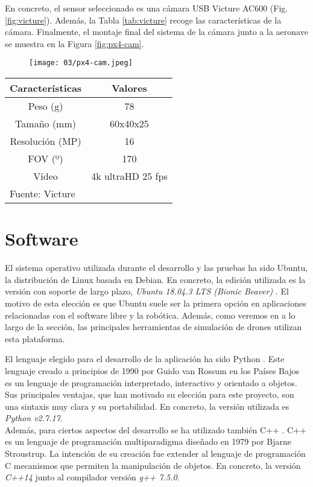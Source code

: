 \documentclass[../main.tex]{subfiles}
\begin{document}
En concreto, el sensor seleccionado es una cámara USB Victure AC600 (Fig. \ref{fig:victure}). Además, la Tabla \ref{tab:victure} recoge las características de la cámara. Finalmente, el montaje final del sistema de la cámara junto a la aeronave se muestra en la Figura \ref{fig:px4-cam}.

\begin{figure}[!ht]
 	{\texttt{[image: 03/px4-cam.jpeg]}}
\end{figure}

\begin{table}[H]
	{\begin{tabular}{|c|c|}
		\hline
		\textbf{Características} & \textbf{Valores} \\
		\hline
		Peso (g)            & 78 \\
		\hline
        Tamaño (mm)         & 60x40x25 \\
        \hline
        Resolución (MP)     & 16 \\
        \hline
        FOV (º)             & 170 \\
        \hline
        Vídeo               & 4k ultraHD 25 fps \\
        \hline
		\multicolumn{2}{l}{Fuente: Victure}
	\end{tabular}}
\end{table}

\section{Software} \label{section:met-software}
El sistema operativo utilizada durante el desarrollo y las pruebas ha sido Ubuntu, la distribución de Linux basada en Debian. En concreto, la edición utilizada es la versión con soporte de largo plazo, \textit{Ubuntu 18.04.3 LTS (\emph{Bionic Beaver})} \cite{ubuntu}. El motivo de esta elección es que Ubuntu suele ser la primera opción en aplicaciones relacionadas con el software libre y la robótica. Además, como veremos en a lo largo de la sección, las principales herramientas de simulación de drones utilizan esta plataforma.

El lenguaje elegido para el desarrollo de la aplicación ha sido Python \cite{python}. Este lenguaje creado a principios de 1990 por Guido van Rossum en los Países Bajos es un lenguaje de programación interpretado, interactivo y orientado a objetos. Sus principales ventajas, que han motivado su elección para este proyecto, son una sintaxis muy clara y su portabilidad. En concreto, la versión utilizada es \textit{Python v2.7.17}. \\
Además, para ciertos aspectos del desarrollo se ha utilizado también C++ \cite{cpp}. C++ es un lenguaje de programación multiparadigma diseñado en 1979 por Bjarne Stroustrup. La intención de su creación fue extender al lenguaje de programación C mecanismos que permiten la manipulación de objetos. En concreto, la versión \textit{C++14} junto al compilador versión \textit{g++ 7.5.0}.
\end{document}
